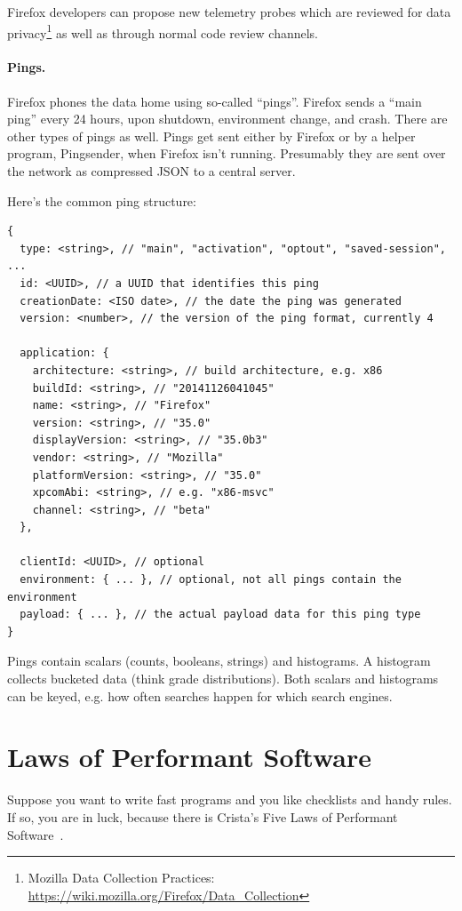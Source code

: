 \documentclass[a4paper]{report}
\begin{document}
Firefox developers can propose new telemetry probes which are reviewed
for data privacy\footnote{Mozilla Data Collection Practices: \url{https://wiki.mozilla.org/Firefox/Data_Collection}} as well as through normal code review channels.

\paragraph{Pings.} Firefox phones the data home using so-called ``pings''.
Firefox sends a ``main ping'' every 24 hours, upon shutdown, environment change,
and crash. There are other types of pings as well. Pings get sent either by Firefox
or by a helper program, Pingsender, when Firefox isn't running. Presumably they
are sent over the network as compressed JSON to a central server.

Here's the common ping structure:

{\scriptsize
\begin{verbatim}
{
  type: <string>, // "main", "activation", "optout", "saved-session", ...
  id: <UUID>, // a UUID that identifies this ping
  creationDate: <ISO date>, // the date the ping was generated
  version: <number>, // the version of the ping format, currently 4

  application: {
    architecture: <string>, // build architecture, e.g. x86
    buildId: <string>, // "20141126041045"
    name: <string>, // "Firefox"
    version: <string>, // "35.0"
    displayVersion: <string>, // "35.0b3"
    vendor: <string>, // "Mozilla"
    platformVersion: <string>, // "35.0"
    xpcomAbi: <string>, // e.g. "x86-msvc"
    channel: <string>, // "beta"
  },

  clientId: <UUID>, // optional
  environment: { ... }, // optional, not all pings contain the environment
  payload: { ... }, // the actual payload data for this ping type
}
\end{verbatim}
}

Pings contain scalars (counts, booleans, strings) and histograms. A histogram collects
bucketed data (think grade distributions). Both scalars and histograms can be keyed, e.g.
how often searches happen for which search engines.

\section*{Laws of Performant Software}

Suppose you want to write fast programs and you like checklists and handy rules. If so, you are in luck, because there is Crista's Five Laws of Performant Software~\cite{lpsw}. 
\end{document}
